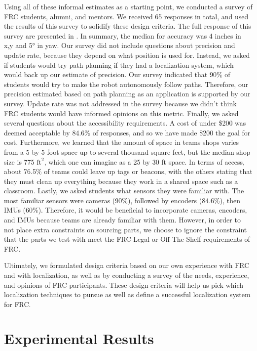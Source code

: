 \documentclass{article}
\newcommand{\Newnameref}[1]{\textit{\nameref{#1}}}
\begin{document}
  Using all of these informal estimates as a starting point, we conducted a survey of FRC students, alumni, and mentors. We received 65 responses in total, and used the results of this survey to solidify these design criteria. The full response of this survey are presented in \Newnameref{appendix:survey}. In summary, the median for accuracy was 4 inches in x,y and \ang{5} in yaw. Our survey did not include questions about precision and update rate, because they depend on what position is used for. Instead, we asked if students would try path planning if they had a localization system, which would back up our estimate of precision. Our survey indicated that 90\% of students would try to make the robot autonomously follow paths. Therefore, our precision estimated based on path planning as an application is supported by our survey. Update rate was not addressed in the survey because we didn't think FRC students would have informed opinions on this metric. Finally, we asked several questions about the accessibility requirements. A cost of under \$200 was deemed acceptable by 84.6\% of responses, and so we have made \$200 the goal for cost. Furthermore, we learned that the amount of space in teams shops varies from a 5 by 5 foot space up to several thousand square feet, but the median shop size is 775 $\text{ft}^2$, which one can imagine as a 25 by 30 ft space. In terms of access, about 76.5\% of teams could leave up tags or beacons, with the others stating that they must clean up everything because they work in a shared space such as a classroom. Lastly, we asked students what sensors they were familiar with. The most familiar sensors were cameras (90\%), followed by encoders (84.6\%), then IMUs (60\%). Therefore, it would be beneficial to incorporate cameras, encoders, and IMUs because teams are already familiar with them. However, in order to not place extra constraints on sourcing parts, we choose to ignore the constraint that the parts we test with meet the FRC-Legal or Off-The-Shelf requirements of FRC.

  Ultimately, we formulated design criteria based on our own experience with FRC and with localization, as well as by conducting a survey of the needs, experience, and opinions of FRC participants. These design criteria will help us pick which localization techniques to pursue as well as define a successful localization system for FRC.




\section{Experimental Results} \label{section:experiments}
\end{document}
